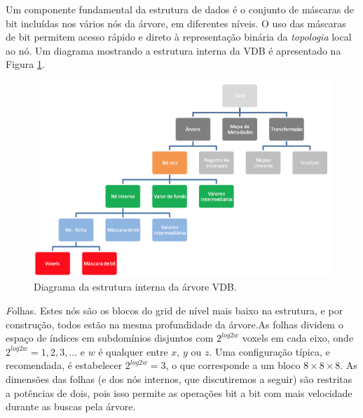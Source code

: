 \documentclass[12pt, a4paper, oneside]{book}
\begin{document}
Um componente fundamental da estrutura de dados é o conjunto de máscaras de bit incluídas nos vários nós da árvore, em diferentes níveis. O uso das máscaras de bit permitem acesso rápido e direto à representação binária da {\it topologia} local ao nó.  Um diagrama mostrando a estrutura interna da VDB é apresentado na Figura \ref{treeStructure}. \\

\begin{figure}[!htb]
\center
\includegraphics[width=16cm]{tree_structure}
\caption{Diagrama da estrutura interna da árvore VDB.}
\label{treeStructure}
\end{figure}

{\emph Folhas}. Estes nós são os blocos do grid de nível mais baixo na estrutura, e por construção, todos estão na mesma profundidade da árvore.As folhas dividem o espaço de índices em subdomínios disjuntos com $2^{log2w}$ voxels em cada eixo, onde $2^{log2w} = 1, 2, 3, ...$ e $w$ é qualquer entre $x$, $y$ ou $z$. Uma configuração típica, e recomendada, é estabelecer $2^{log2w} = 3$, o que corresponde a um bloco $8 \times 8 \times 8$. As dimensões das folhas (e dos nós internos, que discutiremos a seguir) são restritas a potências de dois, pois isso permite as operações bit a bit com mais velocidade durante as buscas pela árvore.


\end{document}
